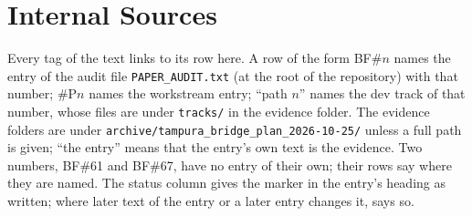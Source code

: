 
\chapter{Internal Sources}
\label{ch:appendix-sources}

Every tag of the text links to its row here. A row of the form BF\#$n$ names the
entry of the audit file \texttt{PAPER\_AUDIT.txt} (at the root of the repository)
with that number; \#P$n$ names the workstream entry; ``path $n$'' names the dev
track of that number, whose files are under \texttt{tracks/} in the evidence
folder. The evidence folders are under
\texttt{archive/tampura\_bridge\_plan\_2026-10-25/} unless a full path is given;
``the entry'' means that the entry's own text is the evidence. Two numbers, BF\#61
and BF\#67, have no entry of their own; their rows say where they are named. The
status column
gives the marker in the entry's heading as written; where later text of the entry or
a later entry changes it,  says so.

